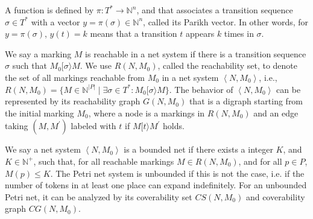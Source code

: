 \documentclass{article}
\begin{document}
A function is defined by $\pi:T^*\to \mathbb{N}^n$, and that associates a transition sequence $\sigma\in T^*$ with a vector $y=\pi(\sigma)\in\mathbb{N}^n$, called its Parikh vector. In other words, for $y=\pi(\sigma)$, $y(t)=k$ means that a transition $t$ appears $k$ times in $\sigma$.

We say a marking $M$ is reachable in a net system if there is a transition sequence $\sigma$ such that $M_0[\sigma\rangle M$. We use $R(N,M_0)$, called the reachability set, to denote the set of all markings reachable from $M_0$ in a net system $\left \langle N, M_0 \right \rangle$, i.e., $R(N,M_0)=\{M\in\mathbb{N}^{|P|}\mid \exists\sigma\in T^*: M_0[\sigma\rangle M\}$. The behavior of $\left\langle N, M_0 \right\rangle$ can be represented by its reachability graph $G(N, M_0)$ that is a digraph starting from the initial marking $M_0$, where a node is a markings in $R(N,M_0)$ and an edge taking $(M,M^\prime)$ labeled with $t$ if $M[t\rangle M^\prime$ holds.

We say a net system $\left \langle N, M_0 \right \rangle$ is a bounded net if there exists a integer $K$, and $K\in \mathbb{N}^+$, such that, for all reachable markings $M\in R(N,M_0)$, and for all $p\in P$, $M(p)\leq K$. The Petri net system is unbounded if this is not the case, i.e. if the number of tokens in at least one place can expand indefinitely. For an unbounded Petri net, it can be analyzed by its coverability set $CS(N, M_0)$ and coverability graph $CG(N, M_0)$.
\end{document}
